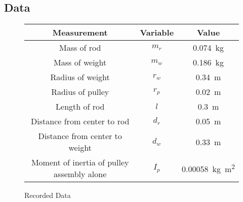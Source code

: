 \documentclass[article, 11pt]{article}
\begin{document}
    \subsection{Data}
    \begin{figure}[H]
        \begin{center}
            \begin{tabular}{|c|c|c|}
                \hline
                \textbf{Measurement} & \textbf{Variable} & \textbf{Value} \\
                \hline
                Mass of rod & $m_r$ & \SI{0.074}{\kilogram} \\
                Mass of weight & $m_w$ & \SI{0.186}{\kilogram} \\
                Radius of weight & $r_w$ & \SI{0.34}{\meter} \\
                Radius of pulley & $r_p$ & \SI{0.02}{\meter} \\
                Length of rod & $l$ & \SI{0.3}{\meter} \\
                Distance from center to rod & $d_r$ & \SI{0.05}{\meter} \\
                Distance from center to weight & $d_w$ & \SI{0.33}{\meter} \\
                Moment of inertia of pulley assembly alone & $I_p$ & \SI{0.00058}{\kilogram\meter^2} \\
                \hline
            \end{tabular}
        \end{center}
        \caption{Recorded Data}
    \end{figure}
\end{document}
